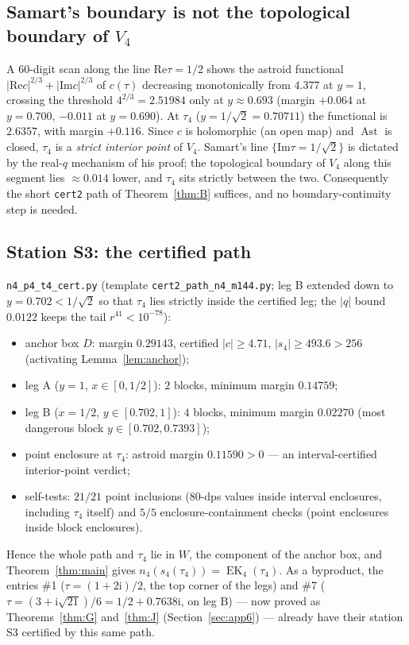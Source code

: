 \documentclass[11pt]{article}
\newcommand{\ii}{\mathrm{i}}
\newcommand{\ReT}{\mathrm{Re}}
\newcommand{\ImT}{\mathrm{Im}}
\DeclareMathOperator{\EK}{EK}
\DeclareMathOperator{\Ast}{Ast}
\theoremstyle{definition}
\theoremstyle{remark}
\begin{document}
\subsection{Samart's boundary is not the topological boundary of
\texorpdfstring{$V_4$}{V4}}\label{subsec:notboundary}

A $60$-digit scan along the line $\ReT\tau=1/2$ shows the astroid
functional $|\ReT c|^{2/3}+|\ImT c|^{2/3}$ of $c(\tau)$ decreasing
monotonically from $4.377$ at $y=1$, crossing the threshold
$4^{2/3}=2.51984$ only at $y\approx0.693$ (margin $+0.064$ at
$y=0.700$, $-0.011$ at $y=0.690$). At $\tau_4$ ($y=1/\sqrt2=0.70711$)
the functional is $2.6357$, with margin $+0.116$. Since $c$ is
holomorphic (an open map) and $\Ast$ is closed, $\tau_4$ is a
\emph{strict interior point} of $V_4$. Samart's line
$\{\ImT\tau=1/\sqrt2\}$ is dictated by the real-$q$ mechanism of his
proof; the topological boundary of $V_4$ along this segment lies
$\approx0.014$ lower, and $\tau_4$ sits strictly between the two.
Consequently the short \texttt{cert2} path of Theorem~\ref{thm:B}
suffices, and no boundary-continuity step is needed.

\subsection{Station S3: the certified path}

\texttt{n4\_p4\_t4\_cert.py} (template
\texttt{cert2\_path\_n4\_m144.py}; leg B extended down to
$y=0.702<1/\sqrt2$ so that $\tau_4$ lies strictly inside the
certified leg; the $|q|$ bound $0.0122$ keeps the tail
$r^{41}<10^{-78}$):
\begin{itemize}
\item anchor box $D$: margin $0.29143$, certified $|c|\ge4.71$,
  $|s_4|\ge493.6>256$ (activating Lemma~\ref{lem:anchor});
\item leg A ($y=1$, $x\in[0,1/2]$): $2$ blocks, minimum margin
  $0.14759$;
\item leg B ($x=1/2$, $y\in[0.702,1]$): $4$ blocks, minimum margin
  $0.02270$ (most dangerous block $y\in[0.702,0.7393]$);
\item point enclosure at $\tau_4$: astroid margin $0.11590>0$ ---
  an interval-certified interior-point verdict;
\item self-tests: $21/21$ point inclusions (80-dps values inside
  interval enclosures, including $\tau_4$ itself) and $5/5$
  enclosure-containment checks (point enclosures inside block
  enclosures).
\end{itemize}
Hence the whole path and $\tau_4$ lie in $W$, the component of the
anchor box, and Theorem~\ref{thm:main} gives
$n_4(s_4(\tau_4))=\EK_4(\tau_4)$. As a byproduct, the entries
\#1 ($\tau=(1+2\ii)/2$, the top corner of the legs) and \#7
($\tau=(3+\ii\sqrt{21})/6=1/2+0.7638\ii$, on leg B) --- now proved
as Theorems~\ref{thm:G} and~\ref{thm:J} (Section~\ref{sec:app6})
--- already have their station S3 certified by this
same path.
\end{document}
